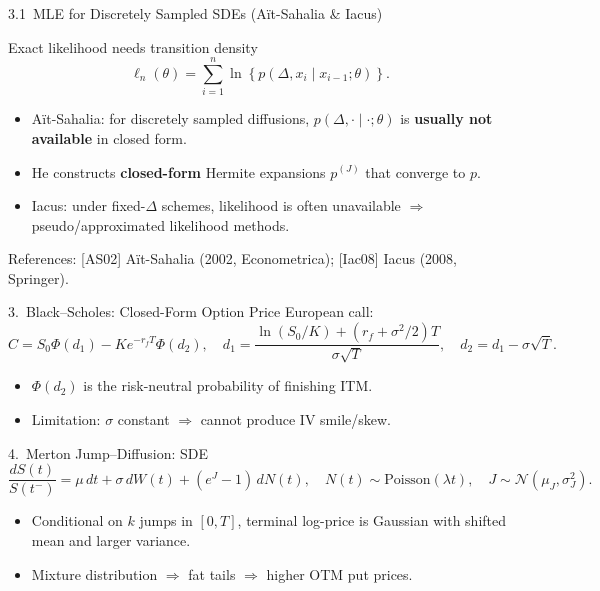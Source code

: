 \documentclass[aspectratio=169,10pt]{beamer}
\begin{document}
\begin{frame}{3.1\ MLE for Discretely Sampled SDEs (A\"it-Sahalia \& Iacus)}
  \begin{block}{Exact likelihood needs transition density}
    \[
      \ell_n(\theta)=\sum_{i=1}^{n}\ln\left\{p(\Delta, x_i \mid x_{i-1};\theta)\right\}.
    \]
  \end{block}
  \begin{itemize}
    \item A\"it-Sahalia: for discretely sampled diffusions, \(p(\Delta,\cdot\mid\cdot;\theta)\) is \textbf{usually not available} in closed form.
    \item He constructs \textbf{closed-form} Hermite expansions \(p^{(J)}\) that converge to \(p\).
    \item Iacus: under fixed-\(\Delta\) schemes, likelihood is often unavailable \(\Rightarrow\) pseudo/approximated likelihood methods.
  \end{itemize}
  \footnotesize References: [AS02] A\"it-Sahalia (2002, Econometrica); [Iac08] Iacus (2008, Springer).
\end{frame}

\begin{frame}{3.\ Black--Scholes: Closed-Form Option Price}
  European call:
  \[
    C = S_0\Phi(d_1) - K e^{-r_fT}\Phi(d_2),
    \quad
    d_1=\frac{\ln(S_0/K)+(r_f+\sigma^2/2)T}{\sigma\sqrt{T}},
    \quad
    d_2=d_1-\sigma\sqrt{T}.
  \]
  \begin{itemize}
    \item \(\Phi(d_2)\) is the risk-neutral probability of finishing ITM.
    \item Limitation: \(\sigma\) constant \(\Rightarrow\) cannot produce IV smile/skew.
  \end{itemize}
\end{frame}

\begin{frame}{4.\ Merton Jump--Diffusion: SDE}
  \[
    \frac{dS(t)}{S(t^-)} = \mu\,dt + \sigma\,dW(t) + (e^J-1)\,dN(t),
    \quad N(t)\sim\text{Poisson}(\lambda t),\quad J\sim \mathcal{N}(\mu_J,\sigma_J^2).
  \]
  \begin{itemize}
    \item Conditional on \(k\) jumps in \([0,T]\), terminal log-price is Gaussian with shifted mean and larger variance.
    \item Mixture distribution \(\Rightarrow\) fat tails \(\Rightarrow\) higher OTM put prices.
  \end{itemize}
\end{frame}
\end{document}
